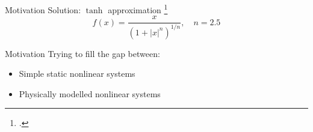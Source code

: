 \begin{frame}{Motivation}
    Solution: $\tanh$ approximation \footcite{Yeh}
    \begin{equation}
        f(x) = \frac{x}{(1 + |x|^n)^{1/n}}, \quad n=2.5
    \end{equation}
\end{frame}

\begin{frame}{Motivation}
    Trying to fill the gap between:
    \newline
    \begin{itemize}
        \item Simple static nonlinear systems
        \item Physically modelled nonlinear systems
    \end{itemize}
\end{frame}
